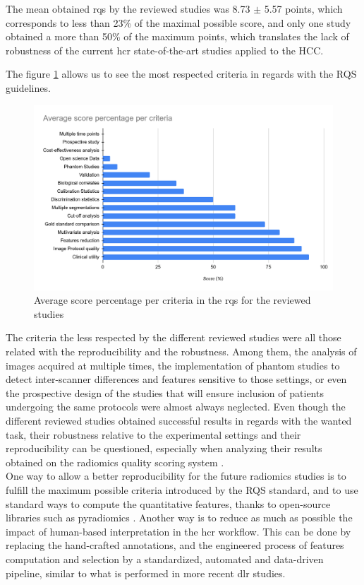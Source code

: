 

The mean obtained \ac{rqs} by the reviewed studies was 8.73 $\pm$ 5.57
points, which corresponds to less than 23\% of the maximal possible
score, and only one study obtained a more than 50\% of the maximum
points, which translates the lack of robustness of the current
\ac{hcr} state-of-the-art studies applied to the HCC.

The figure \ref{RQS_points_per_criteria} allows us to see the most respected criteria in regards
with the RQS guidelines.


\begin{figure}[th!]
\centering
\includegraphics[width=0.7\linewidth]{images/image13}
\caption{Average score percentage per criteria in the \ac{rqs} for the reviewed studies}
\label{RQS_points_per_criteria}
\end{figure}


The criteria the less respected by the different reviewed studies were
all those related with the reproducibility and the robustness. Among
them, the analysis of images acquired at multiple times, the
implementation of phantom studies to detect inter-scanner differences
and features sensitive to those settings, or even the prospective design
of the studies that will ensure inclusion of patients undergoing the
same protocols were almost always neglected.
Even though the different reviewed studies obtained successful results
in regards with the wanted task, their robustness relative to the
experimental settings and their reproducibility can be questioned,
especially when analyzing their results obtained on the radiomics
quality scoring system \cite{Lambin2017}. \\
One way to allow a better reproducibility for the future radiomics
studies is to fulfill the maximum possible criteria introduced by the
RQS standard, and to use standard ways to compute the
quantitative features, thanks to open-source libraries such as
pyradiomics \cite{VanGriethuysen2017}. Another way is to reduce as much
as possible the impact of human-based interpretation in the \ac{hcr}
workflow. This can be done by replacing the hand-crafted annotations,
and the engineered process of features computation and selection by a
standardized, automated and data-driven pipeline, similar to what is
performed in more recent \ac{dlr} studies.


